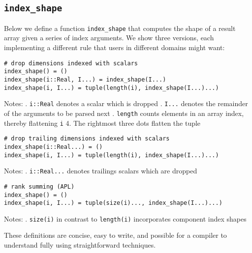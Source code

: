 \documentclass[preprint]{sigplanconf}
\begin{document}
\subsection{\texttt{index\_shape}}

Below we define a function \texttt{index\_shape} that computes the shape of a
result array given a series of index arguments. We show three versions, each
implementing a different rule that users in different domains might want:

{\small
\begin{verbatim}
# drop dimensions indexed with scalars
index_shape() = ()
index_shape(i::Real, I...) = index_shape(I...)
index_shape(i, I...) = tuple(length(i), index_shape(I...)...)
\end{verbatim}
}

\noindent Notes: . \verb+i::Real+ denotes a scalar which is dropped . \verb+I...+ denotes the remainder of the arguments to be parsed next . \verb+length+ counts  elements in an array index, thereby flattening \verb+i+
4. The rightmost three dots flatten the tuple


{\small
\begin{verbatim}
# drop trailing dimensions indexed with scalars
index_shape(i::Real...) = ()
index_shape(i, I...) = tuple(length(i), index_shape(I...)...)
\end{verbatim}
}

\noindent Notes: . \verb+i::Real...+ denotes trailings scalars  which are dropped \newline


{\small
\begin{verbatim}
# rank summing (APL)
index_shape() = ()
index_shape(i, I...) = tuple(size(i)..., index_shape(I...)...)
\end{verbatim}
}


\noindent Notes: . \verb+size(i)+ in contrast to \verb+length(i)+ incorporates component index shapes \newline

These definitions are concise, easy to write, and possible for a compiler to
understand fully using straightforward techniques.
\end{document}
